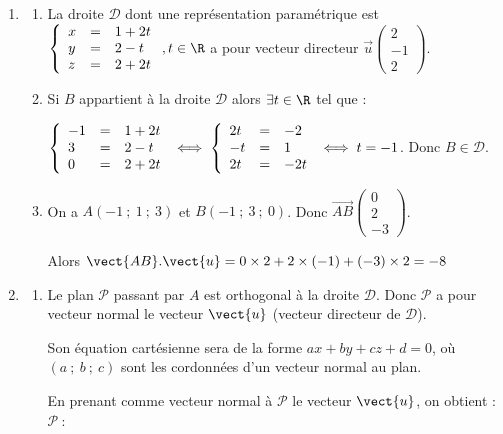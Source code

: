 \medskip

\begin{enumerate}
	\item 
	\begin{enumerate}
	\item La droite $\mathcal{D}$ dont une représentation paramétrique est $\left\{\begin{array}{l c l}
		x&=&1+2t\\y &=& 2 - t\\z&=& 2+2t
	\end{array}\right.  , t \in \R$ a pour vecteur directeur \(\overrightarrow{u}\begin{pmatrix}2\\-1\\2\end{pmatrix}\).
	\item Si $B$ appartient à la droite $\mathcal{D}$ alors $\exists t \in \R$ tel que :
	
	 $\left\{\begin{array}{l c l} -1&=&1+2t\\3 &=& 2 - t\\0&=& 2+2t
	\end{array}\right.\iff \left\{\begin{array}{l c l}
	2t&=&-2\\-t&=&1\\2t&=&-2t\end{array}\right. \iff t=-1 $. Donc $B \in  \mathcal{D}$.
\item On a $A(-1~;~1~;~3)$ et $B(-1~;~3~;~0)$. Donc \(\overrightarrow{AB}\begin{pmatrix}0\\2\\-3\end{pmatrix}\).

Alors $\vect{AB}.\vect{u}=0\times 2+2\times (-1)+(-3)\times 2=-8$
\end{enumerate}
\item 
	\begin{enumerate}
		\item Le plan $\mathcal{P}$ passant par $A$ est orthogonal à la droite $\mathcal{D}$. Donc $\mathcal{P}$ a pour vecteur normal le vecteur $\vect{u}$ (vecteur directeur de $\mathcal{D}$).
	
Son équation cartésienne sera de la forme $ax+by+cz+d=0$, où $(a~;~b~;~c)$ sont les cordonnées d'un vecteur normal au plan.
	
En prenant comme vecteur normal à $\mathcal{P}$ le vecteur $\vect{u}$, on obtient : $\mathcal{P}~:$


\end{enumerate}
\end{enumerate}
